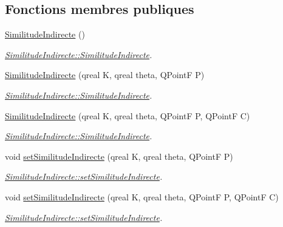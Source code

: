 \subsection*{Fonctions membres publiques}
\begin{DoxyCompactItemize}
\item 
\hypertarget{class_similitude_indirecte_a3f38af24b7ab4c26c96a6f67aa6b5ed4}{}\hyperlink{class_similitude_indirecte_a3f38af24b7ab4c26c96a6f67aa6b5ed4}{Similitude\+Indirecte} ()\label{class_similitude_indirecte_a3f38af24b7ab4c26c96a6f67aa6b5ed4}

\begin{DoxyCompactList}\small\item\em \hyperlink{class_similitude_indirecte_a3f38af24b7ab4c26c96a6f67aa6b5ed4}{Similitude\+Indirecte\+::\+Similitude\+Indirecte}. \end{DoxyCompactList}\item 
\hyperlink{class_similitude_indirecte_a163c2a1ce46d77570755e72c9e9b7ea6}{Similitude\+Indirecte} (qreal K, qreal theta, Q\+Point\+F P)
\begin{DoxyCompactList}\small\item\em \hyperlink{class_similitude_indirecte_a3f38af24b7ab4c26c96a6f67aa6b5ed4}{Similitude\+Indirecte\+::\+Similitude\+Indirecte}. \end{DoxyCompactList}\item 
\hyperlink{class_similitude_indirecte_a2d19403d78f488b0acaac269320176c4}{Similitude\+Indirecte} (qreal K, qreal theta, Q\+Point\+F P, Q\+Point\+F C)
\begin{DoxyCompactList}\small\item\em \hyperlink{class_similitude_indirecte_a3f38af24b7ab4c26c96a6f67aa6b5ed4}{Similitude\+Indirecte\+::\+Similitude\+Indirecte}. \end{DoxyCompactList}\item 
void \hyperlink{class_similitude_indirecte_aeacc6c5446e47385e70f385e6796f4ef}{set\+Similitude\+Indirecte} (qreal K, qreal theta, Q\+Point\+F P)
\begin{DoxyCompactList}\small\item\em \hyperlink{class_similitude_indirecte_aeacc6c5446e47385e70f385e6796f4ef}{Similitude\+Indirecte\+::set\+Similitude\+Indirecte}. \end{DoxyCompactList}\item 
void \hyperlink{class_similitude_indirecte_a0ca3f4cdc2eb804513fa46e1fbc8534f}{set\+Similitude\+Indirecte} (qreal K, qreal theta, Q\+Point\+F P, Q\+Point\+F C)
\begin{DoxyCompactList}\small\item\em \hyperlink{class_similitude_indirecte_aeacc6c5446e47385e70f385e6796f4ef}{Similitude\+Indirecte\+::set\+Similitude\+Indirecte}. \end{DoxyCompactList}\end{DoxyCompactItemize}
